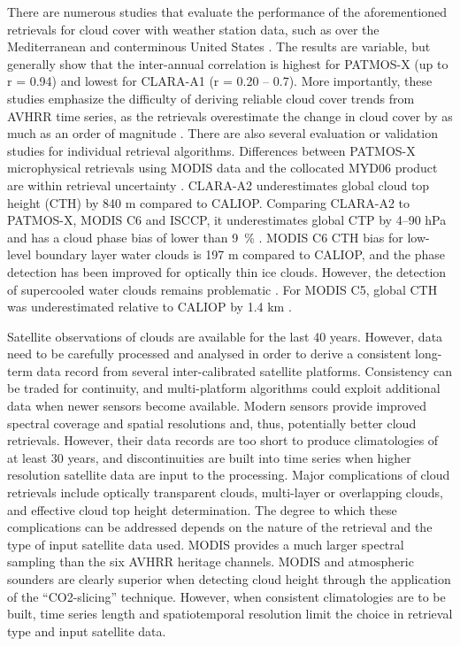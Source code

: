 There are numerous studies that evaluate the performance of the aforementioned retrievals for cloud cover with weather station data, such as over the Mediterranean \citep{Sanchez17} and conterminous United States \citep{Sun15}. The results are variable, but generally show that the inter-annual correlation is highest for PATMOS-X (up to r = 0.94) and lowest for CLARA-A1 (r = 0.20 -- 0.7). More importantly, these studies emphasize the difficulty of deriving reliable cloud cover trends from AVHRR time series, as the retrievals overestimate the change in cloud cover by as much as an order of magnitude \citep{Sun15}. There are also several evaluation or validation studies for individual retrieval algorithms. Differences between PATMOS-X microphysical retrievals using MODIS data and the collocated MYD06 product are within retrieval uncertainty \citep{Walther12}. CLARA-A2 underestimates global cloud top height (CTH) by 840 m compared to CALIOP. Comparing CLARA-A2 to PATMOS-X, MODIS C6 and ISCCP, it underestimates global CTP by 4--90 hPa and has a cloud phase bias of lower than 9~\% \citep{CLARA_A2_PVIR}. MODIS C6 CTH bias for low-level boundary layer water clouds is 197 m compared to CALIOP, and the phase detection has been improved for optically thin ice clouds. However, the detection of supercooled water clouds remains problematic \citep{Baum12}. For MODIS C5, global CTH was underestimated relative to CALIOP by 1.4 km \citep{Holz08}.

Satellite observations of clouds are available for the last 40 years. However, data need to be carefully processed and analysed in order to derive a consistent long-term data record from several inter-calibrated satellite platforms. Consistency can be traded for continuity, and multi-platform algorithms could exploit additional data when newer sensors become available. Modern sensors provide improved spectral coverage and spatial resolutions and, thus, potentially better cloud retrievals. However, their data records are too short to produce climatologies of at least 30 years, and discontinuities are built into time series when higher resolution satellite data are input to the processing. Major complications of cloud retrievals include optically transparent clouds, multi-layer or overlapping clouds, and effective cloud top height determination. The degree to which these complications can be addressed depends on the nature of the retrieval and the type of input satellite data used. MODIS provides a much larger spectral sampling than the six AVHRR heritage channels. MODIS and atmospheric sounders are clearly superior when detecting cloud height through the application of the ``CO2-slicing'' technique. However, when consistent climatologies are to be built, time series length and spatiotemporal resolution limit the choice in retrieval type and input satellite data.

